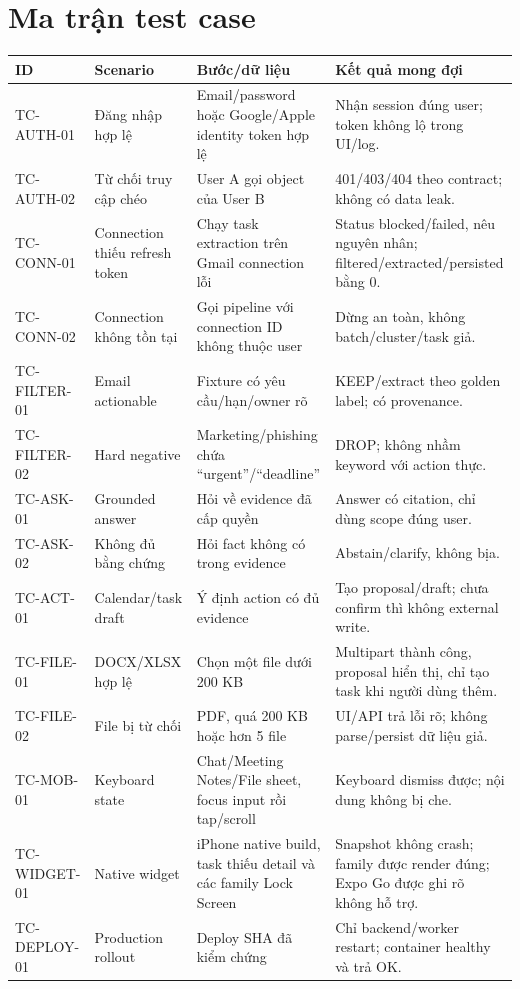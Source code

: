 \documentclass[12pt,a4paper]{article}
\begin{document}
\section{Ma trận test case}
\footnotesize
\begin{longtable}{P{1.9cm}P{2.8cm}P{4.1cm}P{5.0cm}}
\toprule ID & Scenario & Bước/dữ liệu & Kết quả mong đợi \\ \midrule\endhead
TC-AUTH-01 & Đăng nhập hợp lệ & Email/password hoặc Google/Apple identity token hợp lệ & Nhận session đúng user; token không lộ trong UI/log. \\
TC-AUTH-02 & Từ chối truy cập chéo & User A gọi object của User B & 401/403/404 theo contract; không có data leak. \\
TC-CONN-01 & Connection thiếu refresh token & Chạy task extraction trên Gmail connection lỗi & Status blocked/failed, nêu nguyên nhân; filtered/extracted/persisted bằng 0. \\
TC-CONN-02 & Connection không tồn tại & Gọi pipeline với connection ID không thuộc user & Dừng an toàn, không batch/cluster/task giả. \\
TC-FILTER-01 & Email actionable & Fixture có yêu cầu/hạn/owner rõ & KEEP/extract theo golden label; có provenance. \\
TC-FILTER-02 & Hard negative & Marketing/phishing chứa ``urgent''/``deadline'' & DROP; không nhầm keyword với action thực. \\
TC-ASK-01 & Grounded answer & Hỏi về evidence đã cấp quyền & Answer có citation, chỉ dùng scope đúng user. \\
TC-ASK-02 & Không đủ bằng chứng & Hỏi fact không có trong evidence & Abstain/clarify, không bịa. \\
TC-ACT-01 & Calendar/task draft & Ý định action có đủ evidence & Tạo proposal/draft; chưa confirm thì không external write. \\
TC-FILE-01 & DOCX/XLSX hợp lệ & Chọn một file dưới 200 KB & Multipart thành công, proposal hiển thị, chỉ tạo task khi người dùng thêm. \\
TC-FILE-02 & File bị từ chối & PDF, quá 200 KB hoặc hơn 5 file & UI/API trả lỗi rõ; không parse/persist dữ liệu giả. \\
TC-MOB-01 & Keyboard state & Chat/Meeting Notes/File sheet, focus input rồi tap/scroll & Keyboard dismiss được; nội dung không bị che. \\
TC-WIDGET-01 & Native widget & iPhone native build, task thiếu detail và các family Lock Screen & Snapshot không crash; family được render đúng; Expo Go được ghi rõ không hỗ trợ. \\
TC-DEPLOY-01 & Production rollout & Deploy SHA đã kiểm chứng & Chỉ backend/worker restart; container healthy và  trả OK. \\
\bottomrule
\end{longtable}
\end{document}
